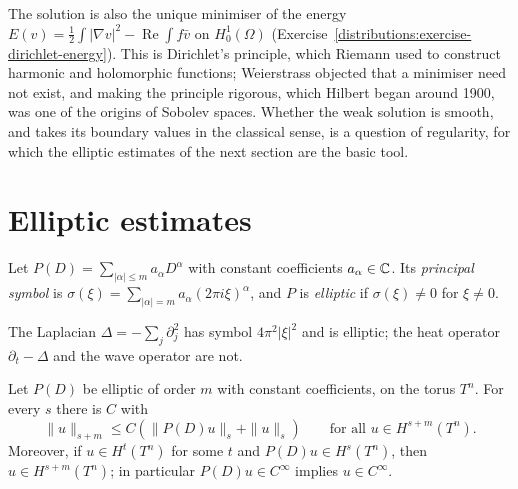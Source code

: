 The solution is also the unique minimiser of the energy $E(v) = \frac12\int|\nabla v|^2 - \operatorname{Re}\int f\bar v$ on $H^1_0(\Omega)$ (Exercise~\ref{distributions:exercise-dirichlet-energy}). This is
Dirichlet's principle, which Riemann used to construct harmonic and holomorphic functions; Weierstrass objected that a minimiser need not exist, and making the principle rigorous, which Hilbert
began around 1900, was one of the origins of Sobolev spaces. Whether the weak solution is smooth, and takes its boundary values in the classical sense, is a question of regularity, for which the
elliptic estimates of the next section are the basic tool.

\section{Elliptic estimates}\label{distributions:section-elliptic}

\begin{definition}\label{distributions:definition-elliptic-constant}
Let $P(D) = \sum_{|\alpha| \leq m}a_\alpha D^\alpha$ with constant coefficients $a_\alpha \in \mathbb{C}$. Its \emph{principal symbol} is $\sigma(\xi) = \sum_{|\alpha| = m}a_\alpha(2\pi i\xi)^\alpha$, and $P$ is
\emph{elliptic} if $\sigma(\xi) \neq 0$ for $\xi \neq 0$.
\end{definition}

\begin{example}\label{distributions:example-laplacian}
The Laplacian $\Delta = -\sum_j\partial_j^2$ has symbol $4\pi^2|\xi|^2$ and is elliptic; the heat operator $\partial_t - \Delta$ and the wave operator are not.
\end{example}

\begin{theorem}\label{distributions:theorem-elliptic-estimate}
Let $P(D)$ be elliptic of order $m$ with constant coefficients, on the torus $T^n$. For every $s$ there is $C$ with
\[
\|u\|_{s+m} \leq C\left(\|P(D)u\|_s + \|u\|_s\right) \qquad \text{for all } u \in H^{s+m}(T^n).
\]
Moreover, if $u \in H^t(T^n)$ for some $t$ and $P(D)u \in H^s(T^n)$, then $u \in H^{s+m}(T^n)$; in particular $P(D)u \in C^\infty$ implies $u \in C^\infty$.
\end{theorem}

